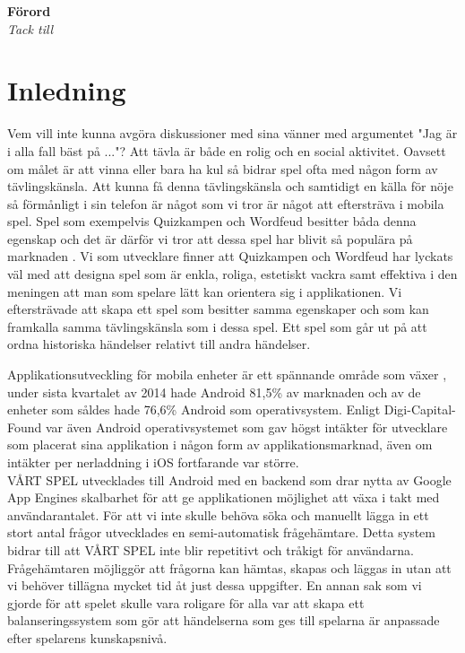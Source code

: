 \documentclass[a4paper, 11pt]{article}
\begin{document}
\newpage

\begin{center}
\textbf{Förord}\\
\textit{Tack till}
\end{center}
\newpage
\tableofcontents
\pagebreak




\section{Inledning}
Vem vill inte kunna avgöra diskussioner med sina vänner med argumentet "Jag är i alla fall bäst på ..."? 
Att tävla är både en rolig och en social aktivitet. Oavsett om målet är att vinna eller bara ha kul så bidrar spel ofta med någon form av tävlingskänsla. Att kunna få denna tävlingskänsla och samtidigt en källa för nöje så förmånligt i sin telefon är något som vi tror är något att eftersträva i mobila spel. Spel som exempelvis Quizkampen \cite{quiz} och Wordfeud \cite{wordfeud} besitter båda denna egenskap och det är därför vi tror att dessa spel har blivit så populära på marknaden \cite{appsalesrating}. Vi som utvecklare finner att Quizkampen och Wordfeud har lyckats väl med att designa spel som är enkla, roliga, estetiskt vackra samt effektiva i den meningen att man som spelare lätt kan orientera sig i applikationen. Vi eftersträvade att skapa ett spel som besitter samma egenskaper och som kan framkalla samma tävlingskänsla som i dessa spel. Ett spel som går ut på att ordna historiska händelser relativt till andra händelser. 

Applikationsutveckling för mobila enheter är ett spännande område som växer \cite{IDC}, under sista kvartalet av 2014 hade Android 81,5\% av marknaden och av de enheter som såldes hade 76,6\% Android som operativsystem. Enligt Digi-Capital-Found \cite{revenue} var även Android operativsystemet som gav högst intäkter för utvecklare som placerat sina applikation i någon form av applikationsmarknad, även om intäkter per nerladdning i iOS fortfarande var större. \\

VÅRT SPEL utvecklades till Android med en backend som drar nytta av Google App Engines skalbarhet för att ge applikationen möjlighet att växa i takt med användarantalet. För att vi inte skulle behöva söka och manuellt lägga in ett stort antal frågor utvecklades en semi-automatisk frågehämtare. Detta system bidrar till att VÅRT SPEL inte blir repetitivt och tråkigt för användarna. Frågehämtaren möjliggör att frågorna kan hämtas, skapas och läggas in utan att vi behöver tillägna mycket tid åt just dessa uppgifter. En annan sak som vi gjorde för att spelet skulle vara roligare för alla var att skapa ett balanseringssystem som gör att händelserna som ges till spelarna är anpassade efter spelarens kunskapsnivå.
\end{document}
